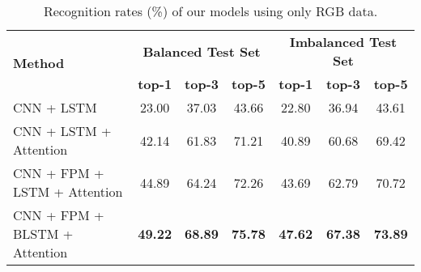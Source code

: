 \documentclass[11pt, a4paper, singlecolumn]{article}
\begin{document}
\begin{table} 
	\caption{Recognition rates (\%) of our models using only RGB data.}
	\centering
	\begin{tabular}{l|ccc|ccc}
		\hline
		\multirow{2}{*}{\textbf{Method}} &
		
		\multicolumn{3}{c}{\textbf{Balanced Test Set}} & \multicolumn{3}{c}{\textbf{Imbalanced Test Set}}                                                                                                                                                                       \\ 
		& {\textbf{top-1}} & {\textbf{top-3}} & {\textbf{top-5}} & {\textbf{top-1}} & {\textbf{top-3}} & {\textbf{top-5}} \\ \hline
		
		CNN + LSTM  & 23.00 & 37.03 & 43.66 & 22.80 & 36.94 & 43.61 \\ CNN + LSTM + Attention  & 42.14 & 61.83 & 71.21 & 40.89 & 60.68 & 69.42 \\ 
		CNN + FPM + LSTM + Attention   & 44.89 & 64.24 & 72.26 & 43.69 & 62.79 & 70.72 \\
		CNN + FPM + BLSTM + Attention   & \textbf{49.22} & \textbf{68.89} & \textbf{75.78} & \textbf{47.62} & \textbf{67.38} & \textbf{73.89}  \\ \hline		
		
	\end{tabular}
	\label{tab:autsl_rgb}
\end{table}
\end{document}
